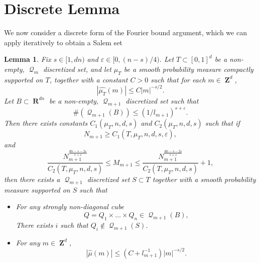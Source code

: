\documentclass[12pt,reqno]{amsart}
\newtheorem{lemma}[theorem]{Lemma}
\DeclareMathOperator{\RR}{\mathbf{R}}
\DeclareMathOperator{\ZZ}{\mathbf{Z}}
\DeclareMathOperator{\DQ}{\mathcal{Q}}
\begin{document}
\section{Discrete Lemma}

We now consider a discrete form of the Fourier bound argument, which we can apply iteratively to obtain a Salem set 

\begin{lemma}
	Fix $s \in [1,dn)$ and $\varepsilon \in [0,(n-s)/4)$. Let $T \subset [0,1]^d$ be a non-empty, $\DQ_m$ discretized set, and let $\mu_T$ be a smooth probability measure compactly supported on $T$, together with a constant $C > 0$ such that for each $m \in \ZZ^d$,
    \[ |\widehat{\mu_T}(m)| \leq C |m|^{-s/2}. \]
    Let $B \subset \RR^{dn}$ be a non-empty, $\DQ_{m+1}$ discretized set such that
    \begin{equation} \label{equation1290419204912090120912}
	   \#(\DQ_{m+1}(B)) \leq (1/l_{m+1})^{s + \varepsilon}.
    \end{equation}
	Then there exists constants $C_1(\mu_T,n,d,s)$ and $C_2(\mu_T,n,d,s)$ such that if
    \begin{equation} \label{equation1095121284102}
        N_{m+1} \geq C_1(T,\mu_T,n,d,s,\varepsilon),
    \end{equation}
    and
    \begin{equation} \label{equation5890129048128941891}
        \frac{N_{m+1}^{\frac{dn - s - 2\varepsilon}{s + \varepsilon}}}{C_2(T,\mu_T,n,d,s)} \leq M_{m+1} \leq \frac{N_{m+1}^{\frac{dn - s - 2\varepsilon}{s + \varepsilon}}}{C_2(T,\mu_T,n,d,s)} + 1,
    \end{equation}
    then there exists a $\DQ_{m+1}$ discretized set $S \subset T$ together with a smooth probability measure supported on $S$ such that
	\begin{itemize}
		\item For any strongly non-diagonal cube
		\[ Q = Q_1 \times \dots \times Q_n \in \DQ_{m+1}(B), \]
		There exists $i$ such that $Q_i \not \in \DQ_{m+1}(S)$.

		\item For any $m \in \ZZ^d$,
		\[ |\widehat{\mu}(m)| \leq (C + l_{m+1}^{-1}) |m|^{-s/2}. \]
	\end{itemize}
\end{lemma}
\end{document}
